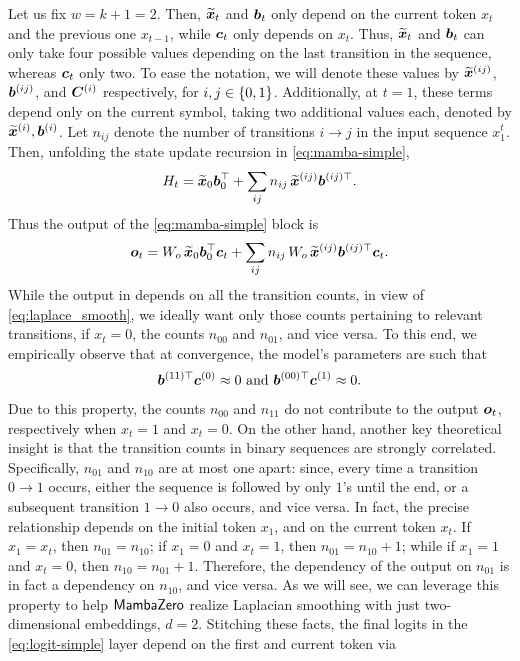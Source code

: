  Let us fix $w=k+1=2$. Then, $\widetilde{\boldsymbol{x}}_t$ and $\boldsymbol{b}_t$ only depend on the current token $x_t$ and the previous one $x_{t-1}$, while $\boldsymbol{c}_t$ only depends on $x_t$. Thus, $\widetilde{\boldsymbol{x}}_t$ and $\boldsymbol{b}_t$ can only take four possible values depending on the last transition in the sequence, whereas $\boldsymbol{c}_t$ only two. To ease the notation, we will denote these values by $\widetilde{\boldsymbol{x}}^{(ij)}$, $\boldsymbol{b}^{(ij)}$, and $\boldsymbol{C}^{(i)}$ respectively, for $i,j \in\{0,1\}$. Additionally, at $t=1$, these terms depend only on the current symbol, taking two additional values each, denoted by $\widetilde{\boldsymbol{x}}^{(i)}, \boldsymbol{b}^{(i)}$. Let $n_{ij}$ denote the number of transitions $i \to j$ in the input sequence $x_1^t$. Then, unfolding the state update recursion in \ref{eq:mamba-simple},
\begin{equation*}
\label{eq:ht1}
H_t = \widetilde{\boldsymbol{x}}_0 \boldsymbol{b}_0^\top + \sum_{ij} n_{ij} \, \widetilde{\boldsymbol{x}}^{(ij)} \boldsymbol{b}^{(ij)\top} .
\end{equation*}
Thus the output of the \ref{eq:mamba-simple} block is
\begin{equation}
\label{eq:out1}
\boldsymbol{o}_t = W_o \, \widetilde{\boldsymbol{x}}_0 \boldsymbol{b}_0^\top \boldsymbol{c}_t + \sum_{ij}n_{ij}\, W_o \, \widetilde{\boldsymbol{x}}^{(ij)} \boldsymbol{b}^{(ij)\top} \boldsymbol{c}_t .
\end{equation}
While the output in  depends on all the transition counts, in view of \ref{eq:laplace_smooth}, we ideally want only those counts pertaining to relevant transitions, \ie if $x_t = 0$, the counts $n_{00}$ and $n_{01}$, and vice versa. To this end, we empirically observe that at convergence, the model's parameters are such that
\begin{align*}
\boldsymbol{b}^{(11)\top} \boldsymbol{c}^{(0)} \approx 0 \, \, \text{and} \, \, \boldsymbol{b}^{(00)\top} \boldsymbol{c}^{(1)} \approx 0.
\end{align*}
Due to this property, the counts $n_{00}$ and $n_{11}$ do not contribute to the output $\boldsymbol{o}_t$, respectively when $x_t = 1$ and $x_t=0$. On the other hand, another key theoretical insight is that the transition counts in binary sequences are strongly correlated. Specifically, $n_{01}$ and $n_{10}$ are at most one apart: since, every time a transition $0\to 1$ occurs, either the sequence is followed by only $1$'s until the end, or a subsequent transition $1\to 0$ also occurs, and vice versa. In fact, the precise relationship depends on the initial token $x_1$, and on the current token $x_t$. If $x_1 = x_t$, then $n_{01} = n_{10}$; if $x_1=0$ and $x_t = 1$, then $n_{01} = n_{10}+1$; while if $x_1 = 1$ and $x_t=0$, then $n_{10} = n_{01}+1$. Therefore, the dependency of the output on $n_{01}$ is in fact a dependency on $n_{10}$, and vice versa. As we will see, we can leverage this property to help $\mathsf{MambaZero}$ realize Laplacian smoothing with just two-dimensional embeddings, \ie $d=2$. Stitching these facts, the final logits in the \ref{eq:logit-simple} layer depend on the first and current token via
